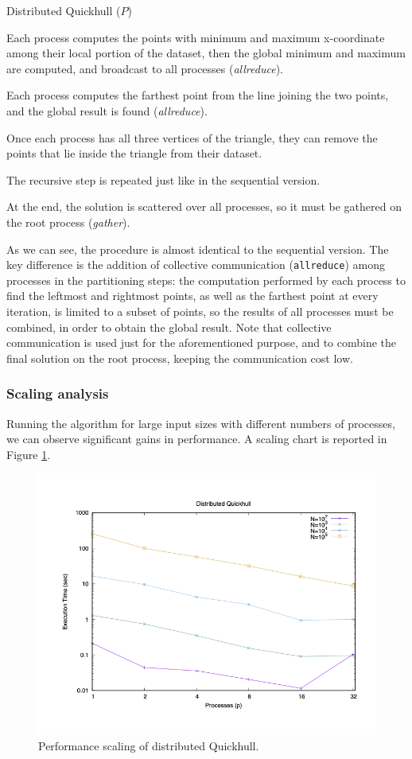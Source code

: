 \documentclass[]{finalproject}
\begin{document}
\begin{algorithm}
  \caption{Distributed Quickhull ($P$)}
  \label{alg:qh3}
  Each process computes the points with minimum and maximum x-coordinate among their local portion of the dataset, then the global minimum and maximum are computed, and broadcast to all processes (\textit{allreduce}).

  Each process computes the farthest point from the line joining the two points, and the global result is found (\textit{allreduce}).

  Once each process has all three vertices of the triangle, they can remove the points that lie inside the triangle from their dataset.

  The recursive step is repeated just like in the sequential version.

  At the end, the solution is scattered over all processes, so it must be gathered on the root process (\textit{gather}).
\end{algorithm}

As we can see, the procedure is almost identical to the sequential version.
The key difference is the addition of collective communication (\verb|allreduce|) among processes in the partitioning steps:
the computation performed by each process to find the leftmost and rightmost points, as well as the farthest point at every iteration,
is limited to a subset of points, so the results of all processes must be combined, in order to obtain the global result.
Note that collective communication is used just for the aforementioned purpose, and to combine the final solution on the root process,
keeping the communication cost low.

\newpage
\subsubsection{Scaling analysis}
Running the algorithm for large input sizes with different numbers of processes, we can observe significant gains in performance.
A scaling chart is reported in Figure \ref{fig:qh-scaling}.
\begin{figure}[H]
    \centering
    \includegraphics[width=0.7\linewidth]{gpStrongTime.png}
    \caption{Performance scaling of distributed Quickhull.}
    \label{fig:qh-scaling}
\end{figure}
\end{document}
